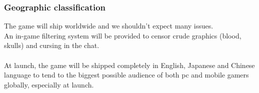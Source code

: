 \subsubsection{Geographic classification}
The game will ship worldwide and we shouldn't expect many issues. \\
An in-game filtering system will be provided to censor crude graphics (blood, skulls) and cursing in the chat. \\\\
At launch, the game will be shipped completely in English, Japanese and Chinese language to tend to the biggest possible audience of both pc and mobile gamers globally, especially at launch. \\

\clearpage